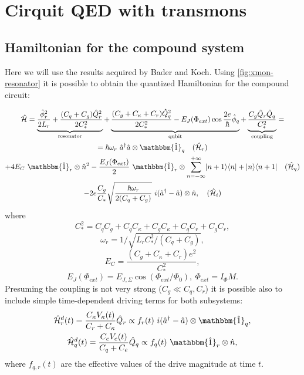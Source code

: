 \documentclass[12pt, twoside]{report}
\DeclarePairedDelimiter\bra{\langle}{\rvert}
\DeclarePairedDelimiter\ket{\lvert}{\rangle}
\numberwithin{equation}{section}
\begin{document}
\section{Cirquit QED with transmons}\label{sec:cQED}


\subsection{Hamiltonian for the compound system}

Here we will use the results acquired by Bader\cite{Bader2013} and Koch\cite{Koch2007}. Using \autoref{fig:xmon-resonator} it is possible to obtain the quantized Hamiltonian for the compound circuit:

\begin{equation}
\begin{gathered}
\mathcal{\hat H} =  \underbrace{\frac{\hat \phi_r^2}{2 L_r} + \frac{(C_q+C_g) \hat Q_r^2}{2C_*^2}}_\text{resonator} 
+ \underbrace{\frac{(C_g + C_\kappa + C_r) \hat Q^2_q}{2C_*^2} - E_J (\Phi_{ext}) \cos \frac{2e}{\hbar}\hat \phi_q }_\text{qubit}
+ \underbrace{\frac{C_g\hat Q_r \hat Q_q}{C_*^2}}_\text{coupling} = \\
=  \hbar\omega_r\ \hat a^\dag \hat a \otimes \mathbbm{\hat 1}_q \quad (\mathcal{\hat H}_r) \\
+ 4 E_C\ \mathbbm{\hat 1}_r \otimes \hat n^2 - \frac{E_J(\Phi_{ext})}{2}\ \mathbbm{\hat 1}_r\otimes \sum_{n=-\infty}^{+\infty} \ket{n+1}\bra{n} + \ket{n}\bra{n+1} \quad (\mathcal{\hat H}_q) \\
- 2e \frac{C_g}{C_*} \sqrt{\frac{\hbar \omega_r }{2(C_q+C_g)}}\ i(\hat a^\dag - \hat a) \otimes \hat n, \quad (\mathcal{\hat H}_i)
\end{gathered}\label{eq:hamiltonian}
\end{equation}
where 
$$C_*^2 = C_q C_g + C_q C_\kappa + C_g C_\kappa + C_q C_r + C_g C_r, $$
$$\omega_r = 1/\sqrt{L_r C_*^2/(C_q+C_g)}, $$
$$E_C = \frac{(C_g+C_\kappa+C_r)e^2}{C_*^2}, $$
$$E_J(\Phi_{ext}) = E_{J,\Sigma} \cos(\Phi_{ext}/\Phi_0),\ \Phi_{ext} = I_\Phi M.$$
Presuming the coupling is not very strong ($C_g \ll C_q, C_r$) it is possible also to include simple time-dependent driving terms for both subsystems:
\begin{gather}
\mathcal{\hat H}_r^d(t) = \frac{C_\kappa V_\kappa(t)}{C_r + C_\kappa} \hat Q_r \propto f_r(t)\ i(\hat a^\dag - \hat a) \otimes \mathbbm{\hat 1}_q, \notag \\
\mathcal{\hat H}_q^d(t) = \frac{C_e V_e(t)}{C_q + C_e} \hat Q_q \propto f_q(t)\  \mathbbm{\hat 1}_r \otimes \hat n,
\label{eq:driving_q}
\end{gather}
where $f_{q, r} (t)$ are the effective values of the drive magnitude at time $t$.
\end{document}
